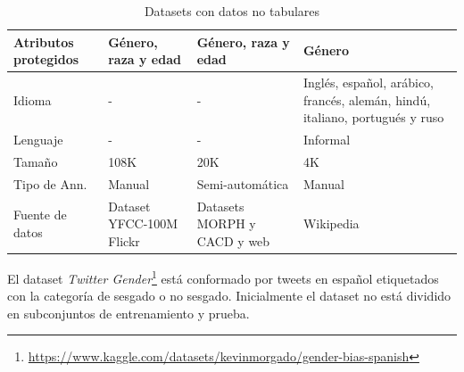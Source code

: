 \begin{table}[htpb]
{\begin{tabular}{lp{}p{}p{}}
                \midrule
                Atributos protegidos & G\'enero, raza y edad                            & G\'enero, raza y edad                               & G\'enero                        \\
                \midrule
                Idioma               & -                                                & -                                                   & Ingl\'es, espa\~nol, ar\'abico, franc\'es, alem\'an, hind\'u, italiano, portugu\'es y ruso\\
                \midrule
                Lenguaje             & -                                                & -                                                   & Informal                        \\
                \midrule
                Tama\~no             & 108K                                             & 20K                                                 & 4K                              \\
                \midrule
                Tipo de Ann.         & Manual                                           & Semi-autom\'atica                                   & Manual                          \\
                \midrule
                Fuente de datos      &  Dataset YFCC-100M Flickr                        & Datasets MORPH y CACD y web                         & Wikipedia                       \\
                \bottomrule
                \bottomrule
            \end{tabular}}
        \caption{Datasets con datos no tabulares}
        \label{table:datasets}
    \end{table}
    
    El dataset \textit{Twitter Gender}\footnote{\url{https://www.kaggle.com/datasets/kevinmorgado/gender-bias-spanish}} est\'a conformado por 
    tweets en espa\~nol etiquetados con la categor\'ia de sesgado o no sesgado. Inicialmente el dataset no est\'a dividido en subconjuntos de 
    entrenamiento y prueba.

